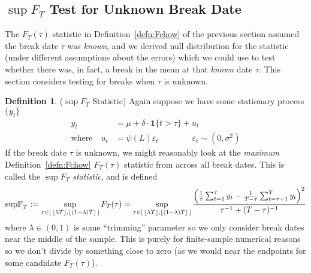 \documentclass[12pt]{article}
\theoremstyle{plain}
\theoremstyle{definition}
\newtheorem{defn}[thm]{Definition}
\theoremstyle{remark}
\begin{document}
\clearpage
\subsection{$\sup F_T$ Test for Unknown Break Date}

The $F_T(\tau)$ statistic in Definition~\ref{defn:Fchow} of the previous
section assumed the break date $\tau$ was \emph{known}, and we derived
null distribution for the statistic (under different assumptions about
the errors) which we could use to test whether there was, in fact, a
break in the mean at that \emph{known} date $\tau$.
This section considers testing for breaks when $\tau$ is unknown.

\begin{defn}($\sup F_T$ Statistic)
\label{defn:supF}
Again suppose we have some stationary process $\{y_t\}$
\begin{align*}
  y_t
  &= \mu + \delta \cdot \mathbf{1}\{t>\tau\} + u_t
  \\
  \text{where}\quad
  u_t &= \psi(L)\varepsilon_t
  \qquad\qquad \varepsilon_t\sim (0,\sigma^2)
\end{align*}
If the break date $\tau$ is unknown, we might reasonably look at the
\emph{maximum} Definition~\ref{defn:Fchow} $F_T(\tau)$ statistic from
across all break dates. This is called the
\emph{$\sup F_T$ statistic}, and is defined
\begin{align*}
  \text{supF}_T
  := \sup_{%
    \tau \in
    [\,
      \lfloor \lambda T\rfloor,
      \lfloor (1-\lambda) T\rfloor
    \,]
  }
  F_T(\tau)
  = \sup_{%
    \tau \in
    [\,
      \lfloor \lambda T\rfloor,
      \lfloor (1-\lambda) T\rfloor
    \,]
  }
  \frac{%
  \left(
  \frac{1}{\tau}\sum_{t=1}^\tau y_t
  -
  \frac{1}{T-\tau}\sum_{t=\tau+1}^T y_t
  \right)^2
  }{\tau^{-1} + (T-\tau)^{-1}}
\end{align*}
where $\lambda\in(0,1)$ is some ``trimming'' parameter so we only
consider break dates near the middle of the sample.
This is purely for finite-sample numerical reasons so we don't divide by
something close to zero (as we would near the endpoints for some
candidate $F_T(\tau)$).
\end{defn}
\end{document}
